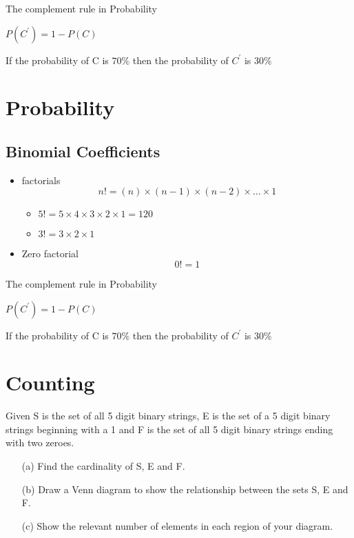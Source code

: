 \documentclass[]{report}
\begin{document}

The complement rule in Probability

$P(C^{\prime}) = 1- P(C)$



If the probability of C is $70 \%$ then the probability of $C^{\prime}$ is $30\%$


\section*{Probability}
\subsection*{Binomial Coefficients}
\begin{itemize}
\item factorials 
\[ n! = (n)\times (n-1)\times(n-2) \times \ldots \times 1 \]
\begin{itemize}
\item $5! = 5 \times 4 \times 3 \times 2 \times 1 = 120 $
\item $3! = 3 \times 2 \times 1$
\end{itemize}
\item Zero factorial
\[ 0! =  1 \]
\end{itemize}


The complement rule in Probability

$P(C^{\prime}) = 1- P(C)$



If the probability of C is $70 \%$ then the probability of $C^{\prime}$ is $30\%$


\section{Counting}
Given S is the set of all 5 digit binary strings, E is the set of a 5 digit
binary strings beginning with a 1 and F is the set of all 5 digit binary strings ending
with two zeroes.
\begin{itemize}
\item[(a)] Find the cardinality of S, E and F.
\item[(b)] Draw a Venn diagram to show the relationship between the sets S, E and F.
\item[(c)] Show the relevant number of elements in each region of your diagram.
\end{itemize}
\end{document}
